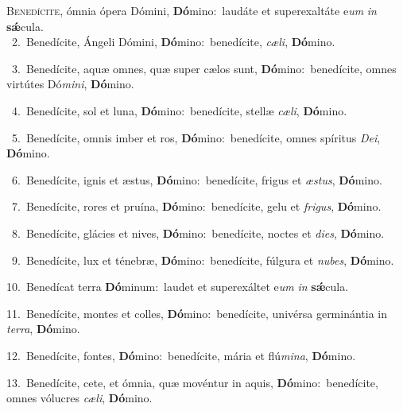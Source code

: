 \lettrine{\initial\textcolor{\initialcolor}{B}}{enedícite,} ómnia ópera Dómini, \textbf{Dó}\-mino:~\star laudáte et superexaltáte e\textit{um} \textit{in} \textbf{sǽ}\-cula.\\
{\numbfont\textcolor{\numbcolor}{~2.}}~Benedícite, Ángeli Dómini, \textbf{Dó}\-mino:~\star benedícite, \textit{cæ}\-\textit{li}, \textbf{Dó}\-mino.\par
{\numbfont\textcolor{\numbcolor}{~3.}}~Benedícite, aquæ omnes, quæ super cælos sunt, \textbf{Dó}\-mino:~\star benedícite, omnes virtútes Dó\-\textit{mi}\-\textit{ni}, \textbf{Dó}\-mino.\par
{\numbfont\textcolor{\numbcolor}{~4.}}~Benedícite, sol et luna, \textbf{Dó}\-mino:~\star benedícite, stellæ \textit{cæ}\-\textit{li}, \textbf{Dó}\-mino.\par
{\numbfont\textcolor{\numbcolor}{~5.}}~Benedícite, omnis imber et ros, \textbf{Dó}\-mino:~\star benedícite, omnes spíritus \textit{De}\-\textit{i}, \textbf{Dó}\-mino.\par
{\numbfont\textcolor{\numbcolor}{~6.}}~Benedícite, ignis et æstus, \textbf{Dó}\-mino:~\star benedícite, frigus et \textit{æs}\-\textit{tus}, \textbf{Dó}\-mino.\par
{\numbfont\textcolor{\numbcolor}{~7.}}~Benedícite, rores et pruína, \textbf{Dó}\-mino:~\star benedícite, gelu et \textit{fri}\-\textit{gus}, \textbf{Dó}\-mino.\par
{\numbfont\textcolor{\numbcolor}{~8.}}~Benedícite, glácies et nives, \textbf{Dó}\-mino:~\star benedícite, noctes et \textit{di}\-\textit{es}, \textbf{Dó}\-mino.\par
{\numbfont\textcolor{\numbcolor}{~9.}}~Benedícite, lux et ténebræ, \textbf{Dó}\-mino:~\star benedícite, fúlgura et \textit{nu}\-\textit{bes}, \textbf{Dó}\-mino.\par
{\numbfont\textcolor{\numbcolor}{10.}}~Benedícat terra \textbf{Dó}\-minum:~\star laudet et superexáltet e\textit{um} \textit{in} \textbf{sǽ}\-cula.\par
{\numbfont\textcolor{\numbcolor}{11.}}~Benedícite, montes et colles, \textbf{Dó}\-mino:~\star benedícite, univérsa germinántia in \textit{ter}\-\textit{ra}, \textbf{Dó}\-mino.\par
{\numbfont\textcolor{\numbcolor}{12.}}~Benedícite, fontes, \textbf{Dó}\-mino:~\star benedícite, mária et flú\-\textit{mi}\-\textit{na}, \textbf{Dó}\-mino.\par
{\numbfont\textcolor{\numbcolor}{13.}}~Benedícite, cete, et ómnia, quæ movéntur in aquis, \textbf{Dó}\-mino:~\star benedícite, omnes vólucres \textit{cæ}\-\textit{li}, \textbf{Dó}\-mino.\par
